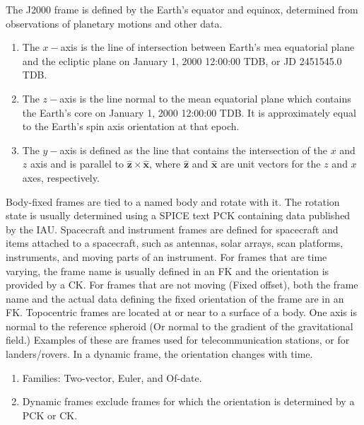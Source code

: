 \documentclass[crop=false,class=article,oneside]{standalone}
\begin{document}
            \begin{definition}
            The J2000 frame is defined by the Earth's equator and equinox, determined from observations of planetary motions and other data. 
            \begin{enumerate}
                \item The $x-$axis is the line of intersection between Earth's mea equatorial plane and the ecliptic plane on January 1, 2000 12:00:00 TDB, or JD 2451545.0 TDB.
                \item The $z-$axis is the line normal to the mean equatorial plane which contains the Earth's core on January 1, 2000 12:00:00 TDB. It is approximately equal to the Earth's spin axis orientation at that epoch.
                \item The $y-$axis is defined as the line that contains the intersection of the $x$ and $z$ axis and is parallel to $\hat{\mathbf{z}}\times \hat{\mathbf{x}}$, where $\hat{\mathbf{z}}$ and $\hat{\mathbf{x}}$ are unit vectors for the $z$ and $x$ axes, respectively.
            \end{enumerate}
            \end{definition}
            Body-fixed frames are tied to a named body and rotate with it. The rotation state is usually determined using a SPICE text PCK containing data published by the IAU. Spacecraft and instrument frames are defined for spacecraft and items attached to a spacecraft, such as antennas, solar arrays, scan platforms, instruments, and moving parts of an instrument. For frames that are time varying, the frame name is usually defined in an FK and the orientation is provided by a CK. For frames that are not moving (Fixed offset), both the frame name and the actual data defining the fixed orientation of the frame are in an FK. Topocentric frames are located at or near to a surface of a body. One axis is normal to the reference spheroid (Or normal to the gradient of the gravitational field.) Examples of these are frames used for telecommunication stations, or for landers/rovers. In a dynamic frame, the orientation changes with time.
            \begin{enumerate}
                \item[] Families: Two-vector, Euler, and Of-date.
                \item[] Dynamic frames exclude frames for which the orientation is determined by a PCK or CK.
            \end{enumerate}
\end{document}
